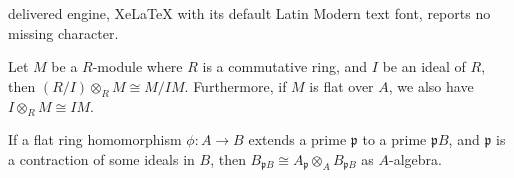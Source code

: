 \documentclass[10pt,a4paper]{amsart}
\begin{document}
delivered engine, XeLaTeX with its default Latin Modern text font, reports no missing character.
	\begin{lemma}\label{lemma: extension of an ideal}
		Let $M$ be a $R$-module where $R$ is a commutative ring, and $I$ be an ideal of $R$, then $(R/I) \otimes_R M \cong M/IM$. Furthermore, if $M$ is flat over $A$, we also have $I \otimes_R M \cong IM$.
	\end{lemma}

	\begin{lemma}\label{lemma: tensor of localization}
	If a flat ring homomorphism $\phi: A\to B$ extends a prime $\mathfrak{p}$ to a prime $\mathfrak{p}B$, and $\mathfrak{p}$ is a contraction of some ideals in $B$, then $B_{\mathfrak{p}B} \cong A_{\mathfrak{p}} \otimes_A B_{\mathfrak{p}B}$ as $A$-algebra.
	\end{lemma}
\end{document}
